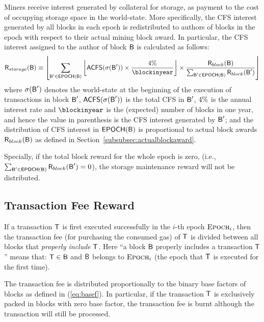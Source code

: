 	Miners receive interest generated by collateral for storage, as payment to the cost of occupying storage space in the world-state.
	More specifically, the CFS interest generated by all blocks in each epoch is redistributed to authors of blocks in the epoch with respect to their actual mining block award.
	In particular, the CFS interest assigned to the author of block $\textsf{B}$ is calculated as follows:
	\begin{align}
		\storageaward(\block) \eqdef 
		\left\lfloor \sum_{\block'\in\epf(\block)} \left\lfloor \mathsf{ACFS}(\st(\block'))
		\times \frac{\interest}{\blockinyear}\right\rfloor
		\times \frac{\award(\block)}{\sum_{\block'\in\epf(\block)} \award(\block') } \right\rfloor
	\end{align}
	where $\mathbf{\sigma}(\textsf{B}')$ denotes the world-state at the beginning of the execution of transactions in block $\textsf{B}'$,
	$\mathsf{ACFS}(\mathbf{\sigma}(\textsf{B}'))$ is the total CFS in $\textsf{B}'$, 
	${4\%}$ is the annual interest rate and $\blockinyear$ is the (expected) number of blocks in one year,
	and hence the value in parenthesis is the CFS interest generated by $\textsf{B}'$;
	and the distribution of CFS interest in $\mathsf{EPOCH} (\textsf{B})$ is proportional to actual block awards $\textsf{R}_{block}(\textsf{B})$ as defined in Section~\ref{subsubsec:actualblockaward}. 

	Specially, if the total block reward for the whole epoch is zero, (i.e., $\sum_{\textsf{B}'\in\mathsf{EPOCH} (\textsf{B})} \textsf{R}_{block}(\textsf{B}')=0$), the storage maintenance reward will not be distributed. 




\subsection{Transaction Fee Reward}

If a transaction $\textsf{T}$ is first executed successfully in the $i$-th epoch $\textsc{Epoch}_i$, then 
the transaction fee (for purchasing the consumed gas) of $\textsf{T}$ is divided between all blocks that 
\emph{properly include }$\textsf{T}$.
Here ``a block $\textsf{B}$ properly includes a transaction $\textsf{T}$'' means that:
$\textsf{T}\in \textsf{B}$ and $\textsf{B}$ belongs to $\textsc{Epoch}_i$ (the epoch that $\textsf{T}$ is executed for the first time).


The transaction fee is distributed proportionally to the binary base factors of blocks as defined in (\ref{eq:basef}). 
% 
In particular, if the transaction $\textsf{T}$ is exclusively packed in blocks with zero base factor, the transaction fee is burnt although the transaction will still be processed. 

